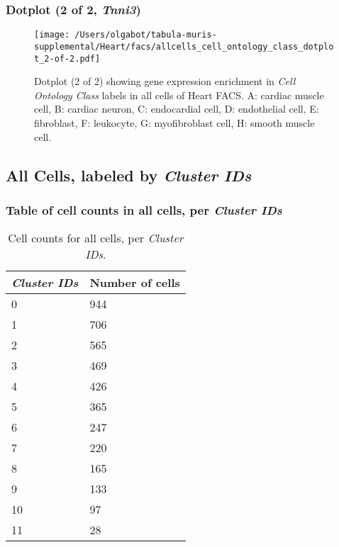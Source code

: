 \clearpage

\subsubsection{Dotplot (2 of 2, \emph{Tnni3})}
\begin{figure}[h]
\centering
\texttt{[image: /Users/olgabot/tabula-muris-supplemental/Heart/facs/allcells\_cell\_ontology\_class\_dotplot\_2-of-2.pdf]}

\caption{ Dotplot (2 of 2)  showing gene expression enrichment in \emph{Cell Ontology Class} labels in all cells of Heart FACS. A: cardiac muscle cell, B: cardiac neuron, C: endocardial cell, D: endothelial cell, E: fibroblast, F: leukocyte, G: myofibroblast cell, H: smooth muscle cell.}
\end{figure}


\clearpage

\subsection{All Cells, labeled by \emph{Cluster IDs}}
\subsubsection{Table of cell counts in all cells, per \emph{Cluster IDs}}\begin{table}[h]
\centering
\label{my-label}
\begin{tabular}{@{}ll@{}}
\toprule

\emph{Cluster IDs}& Number of cells \\ \midrule
0 & 944 \\

1 & 706 \\

2 & 565 \\

3 & 469 \\

4 & 426 \\

5 & 365 \\

6 & 247 \\

7 & 220 \\

8 & 165 \\

9 & 133 \\

10 & 97 \\

11 & 28 \\
\bottomrule
\end{tabular}
\caption{Cell counts for all cells, per \emph{Cluster IDs}.}
\end{table}

